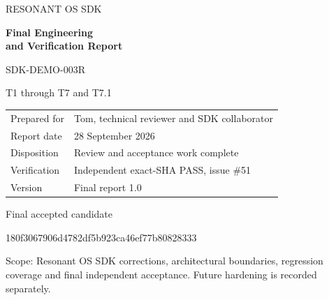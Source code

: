 \documentclass[11pt,letterpaper]{article}
\begin{document}
\thispagestyle{empty}
\vspace*{1.1in}
{\large RESONANT OS SDK\par}
\vspace{0.3in}
{\Huge\bfseries Final Engineering\\[7pt]and Verification Report\par}
\vspace{0.25in}
{\Large SDK-DEMO-003R\par}
\vspace{0.6in}
{\large T1 through T7 and T7.1\par}
\vspace{0.65in}
\begin{tabular}{@{}ll}
Prepared for & Tom, technical reviewer and SDK collaborator\\[8pt]
Report date & 28 September 2026\\[8pt]
Disposition & Review and acceptance work complete\\[8pt]
Verification & Independent exact-SHA PASS, issue \#51\\[8pt]
Version & Final report 1.0
\end{tabular}
\vspace{0.4in}\par
Final accepted candidate\par
{\small\ttfamily 180f3067906d4782df5b923ca46ef77b80828333}\par
\vfill
Scope: Resonant OS SDK corrections, architectural boundaries, regression coverage and final independent acceptance. Future hardening is recorded separately.
\end{document}

